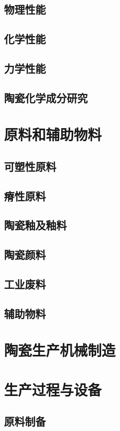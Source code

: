 \documentclass[UTF8]{../../ApplicationUniverse}
\begin{document}
    \subsection{物理性能}
    \subsection{化学性能}
    \subsection{力学性能}
    \subsection{陶瓷化学成分研究}
\section{原料和辅助物料}
    \subsection{可塑性原料}
    \subsection{瘠性原料}
    \subsection{陶瓷釉及釉料}
    \subsection{陶瓷颜料}
    \subsection{工业废料}
    \subsection{辅助物料}
\section{陶瓷生产机械制造}
\section{生产过程与设备}
    \subsection{原料制备}
\end{document}
